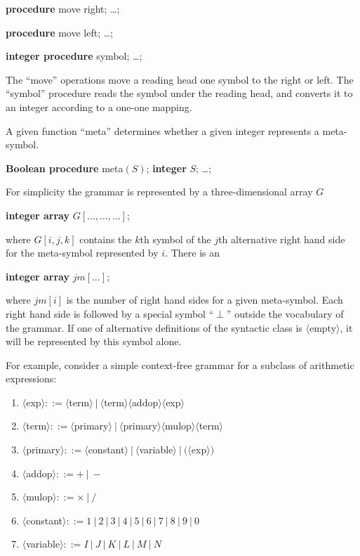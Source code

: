 \documentclass[twoside,11pt]{book}
\begin{document}
\quad \textbf{procedure} move right; \dots;

\quad \textbf{procedure} move left; \dots;

\quad \textbf{integer procedure} symbol; \dots;

\noindent
The ``move'' operations move a reading head one symbol to the right or left. The ``symbol'' procedure reads the symbol under the reading head, and converts it to an integer according to a one-one mapping.

A given function ``meta'' determines whether a given integer represents a meta-symbol.

\quad \textbf{Boolean procedure} meta$(S)$; \textbf{integer} $S$; \dots;

\noindent
For simplicity the grammar is represented by a three-dimensional array $G$

\quad \textbf{integer array} $G[\dots, \dots, \dots]$;

\noindent
where $G[i, j, k]$ contains the $k$th symbol of the $j$th alternative right hand side for the meta-symbol represented by $i$. There is an

\quad \textbf{integer array} $jm[\dots]$;

\noindent
where $jm[i]$ is the number of right hand sides for a given meta-symbol. Each right hand side is followed by a special symbol ``$\perp$'' outside the vocabulary of the grammar. If one of alternative definitions of the syntactic class is $\langle$empty$\rangle$, it will be represented by this symbol alone.

For example, consider a simple context-free grammar for a subclass of arithmetic expressions:

\begin{enumerate}[wide, nosep, label=(\arabic*)]
	\item $\langle$exp$\rangle ::= \langle$term$\rangle\ |\ \langle$term$\rangle\langle$addop$\rangle\langle$exp$\rangle$
	\item $\langle$term$\rangle ::= \langle$primary$\rangle\ |\ \langle$primary$\rangle\langle$mulop$\rangle\langle$term$\rangle$
	\item $\langle$primary$\rangle ::= \langle$constant$\rangle\ |\ \langle$variable$\rangle\ |\ (\langle$exp$\rangle)$
	\item $\langle$addop$\rangle ::= +\ |\ -$
	\item $\langle$mulop$\rangle ::= \times\ |\ /$
	\item $\langle$constant$\rangle ::= 1\ |\ 2\ |\ 3\ |\ 4\ |\ 5\ |\ 6\ |\ 7\ |\ 8\ |\ 9\ |\ 0$
	\item $\langle$variable$\rangle ::= I\ |\ J\ |\ K\ |\ L\ |\ M\ |\ N$
\end{enumerate}
\end{document}
